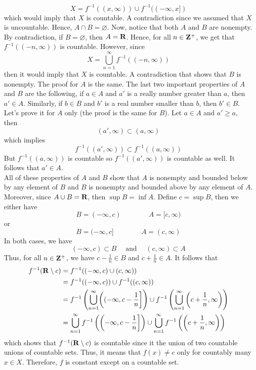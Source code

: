 \begin{solution}
    $$X = f^{-1}((x, \infty)) \cup f^{-1}((-\infty, x])$$
    which would imply that $X$ is countable. A contradiction since we assumed that $X$ is uncountable. Hence, $A \cap B = \varnothing$. Now, notice that both $A$ and $B$ are nonempty. By contradiction, if $B = \varnothing$, then $A = \mathbf{R}$. Hence, for all $n \in \mathbf{Z}^+$, we get that $f^{-1}((-n, \infty))$ is countable. However, since
    $$X = \bigcup_{n=1}^{\infty}f^{-1}((-n, \infty))$$
    then it would imply that $X$ is countable. A contradiction that shows that $B$ is nonempty. The proof for $A$ is the same. The last two important properties of $A$ and $B$ are the following, if $a \in A$ and $a'$ is a really number greater than $a$, then $a' \in A$. Similarly, if $b \in B$ and $b'$ is a real number smaller than $b$, then $b' \in B$. Let's prove it for $A$ only (the proof is the same for $B$). Let $a \in A$ and $a' \geq a$, then 
    $$(a', \infty) \subset (a, \infty)$$
    which implies 
    $$f^{-1}((a', \infty)) \subset f^{-1}((a, \infty))$$
    But $f^{-1}((a, \infty))$ is countable so $f^{-1}((a', \infty))$ is countable as well. It follows that $a' \in A$. \\
    All of these properties of $A$ and $B$ show that $A$ is nonempty and bounded below by any element of $B$ and $B$ is nonempty and bounded above by any element of $A$. Moreover, since $A \cup B = \mathbf{R}$, then $\sup B = \inf A$. Define $c = \sup B$, then we either have
    $$B = (-\infty, c) \qquad \qquad A = [c, \infty)$$
    or
    $$B = (-\infty, c] \qquad \qquad A = (c, \infty)$$
    In both cases, we have
    $$(- \infty, c) \subset B \quad \text{ and } \quad (c, \infty) \subset A$$
    Thus, for all $n \in \mathbf{Z}^+$, we have $c - \frac{1}{n} \in B$ and $c + \frac{1}{n} \in A$. It follows that
    \begin{align*}
        f^{-1}(\mathbf{R} \setminus c) &= f^{-1}((-\infty, c) \cup (c, \infty)) \\
        &= f^{-1}((-\infty, c)) \cup f^{-1}((c, \infty)) \\
        &= f^{-1}\left( \bigcup_{n=1}^{\infty}\biggl( (-\infty, c-\frac{1}{n} \biggr] \right) \cup f^{-1}\left( \bigcup_{n=1}^{\infty}\left(c+\frac{1}{n} , \infty\right) \right) \\
        &= \bigcup_{n=1}^{\infty} f^{-1}\left( \biggl(-\infty, c-\frac{1}{n} \biggr] \right) \cup \bigcup_{n=1}^{\infty} f^{-1}\left(\left(c+\frac{1}{n} , \infty\right) \right) 
    \end{align*}
    which shows that $f^{-1}(\mathbf{R} \setminus c)$ is countable since it the union of two countable unions of countable sets. Thus, it means that $f(x) \neq c$ only for countably many $x \in X$. Therefore, $f$ is constant except on a countable set. \\ 
\end{solution}

